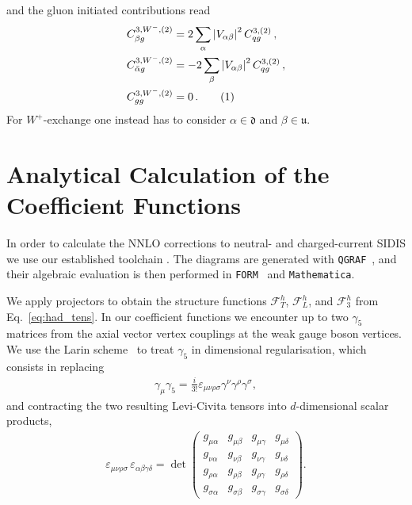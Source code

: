 \documentclass[11pt,a4paper]{article}
\newcommand\numberthis{\addtocounter{equation}{1}\tag{\theequation}}
\begin{document}
and the gluon initiated contributions read
\begin{align*}
C^{3,W^-,(2)}_{\beta g} &= 2\sum_\alpha \left|V_{\alpha\beta}\right|^2 C^{3,(2)}_{qg} \, ,  \\
C^{3,W^-,(2)}_{\bar{\alpha}g} &= -2 \sum_\beta \left|V_{\alpha\beta}\right|^2 C^{3,(2)}_{qg} \, , \\
C^{3,W^-,(2)}_{gg} &=0 \,  . \numberthis
\end{align*}
For $W^+$-exchange one instead has to consider $\alpha\in \mathfrak{d}$ and $\beta\in \mathfrak{u}$.


\section{Analytical Calculation of the Coefficient Functions}
\label{sec:calc}
In order to calculate the NNLO corrections to neutral- and charged-current SIDIS we use our established toolchain \cite{Bonino:2024qbh,Bonino:2024wgg}.
The diagrams are generated with \texttt{QGRAF}~\cite{Nogueira:1991ex}, and their
algebraic evaluation is then performed in
 \texttt{FORM}~\cite{Vermaseren:2000nd} and \texttt{Mathematica}.

We apply projectors to obtain the structure functions $\mathcal{F}_T^h$, $\mathcal{F}_L^h$, and $\mathcal{F}_3^h$ from Eq.~\eqref{eq:had_tens}.
In our coefficient functions we encounter up to two $\gamma_5$ matrices from the axial vector vertex couplings
at the weak gauge boson vertices. We use the Larin scheme~\cite{Larin:1993tq} to
treat $\gamma_5$ in dimensional regularisation, which consists in replacing
\begin{align}
\gamma_\mu \gamma_5 = \frac{i}{3!} \varepsilon_{\mu\nu\rho\sigma} \gamma^\nu \gamma^\rho \gamma^\sigma,
\label{eq:Larin_g5}
\end{align}
and contracting the two resulting  Levi-Civita tensors into $d$-dimensional scalar products,
\begin{align}
\varepsilon_{\mu\nu\rho\sigma} \, \varepsilon_{\alpha\beta\gamma\delta} = \operatorname{det}
\begin{pmatrix}
g_{\mu \alpha} & g_{\mu \beta} & g_{\mu \gamma} & g_{\mu \delta} \\
g_{\nu \alpha} & g_{\nu \beta} & g_{\nu \gamma} & g_{\nu \delta} \\
g_{\rho \alpha} & g_{\rho \beta} & g_{\rho \gamma} & g_{\rho \delta} \\
g_{\sigma \alpha} & g_{\sigma \beta} & g_{\sigma \gamma} & g_{\sigma \delta}
\end{pmatrix}.
\label{eq:Larin_epstens}
\end{align}
\end{document}
